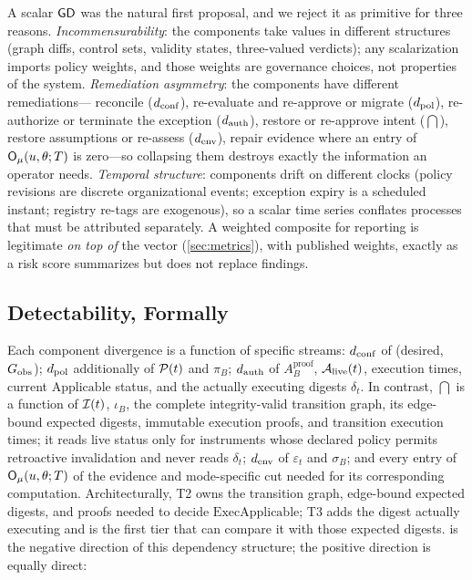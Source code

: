 A scalar $\mathsf{GD}$ was the natural first proposal, and we reject it as primitive
for three reasons. \emph{Incommensurability}: the components take values in
different structures (graph diffs, control sets, validity states,
three-valued verdicts); any scalarization imports policy weights, and those
weights are governance choices, not properties of the system.
\emph{Remediation asymmetry}: the components have different remediations---%
reconcile ($d_{\mathrm{conf}}$), re-evaluate and re-approve or migrate ($d_{\mathrm{pol}}$),
re-authorize or terminate the exception ($d_{\mathrm{auth}}$), restore or re-approve
intent ($\dint$), restore assumptions or re-assess ($d_{\mathrm{env}}$), repair evidence
where an entry of $\mathsf{O}_{\mu}(u,\theta;T)$ is zero---so collapsing them
destroys exactly the information an operator
needs. \emph{Temporal structure}: components drift on different clocks
(policy revisions are discrete organizational events; exception expiry is a
scheduled instant; registry re-tags are exogenous), so a scalar time series
conflates processes that must be attributed separately. A weighted composite
for reporting is legitimate \emph{on top of} the vector (\cref{sec:metrics}),
with published weights, exactly as a risk score summarizes but does not
replace findings.

\subsection{Detectability, Formally}
\label{sec:model-detect}

Each component divergence is a function of specific streams:
$d_{\mathrm{conf}}$ of (desired, $G_{\mathrm{obs}}$); $d_{\mathrm{pol}}$ additionally of $\mathcal{P}(t)$ and
$\pi_B$; $d_{\mathrm{auth}}$ of $A_B^{\mathrm{proof}}$, $\mathcal{A}_{\mathrm{live}}(t)$,
execution times, current $\mathrm{Applicable}$ status, and the actually
executing digests $\delta_t$. In contrast, $\dint$ is a function of $\mathcal{I}(t)$,
$\iota_B$, the complete integrity-valid transition graph, its edge-bound
expected digests, immutable execution proofs, and transition execution times;
it reads live status only for instruments whose declared policy permits
retroactive invalidation and never reads $\delta_t$;
$d_{\mathrm{env}}$ of $\varepsilon_t$ and $\sigma_B$; and every
entry of $\mathsf{O}_{\mu}(u,\theta;T)$ of the evidence and mode-specific cut
needed for its corresponding computation. Architecturally, T2 owns the
transition graph, edge-bound expected digests, and proofs needed to decide
$\mathrm{ExecApplicable}$; T3 adds the digest actually executing and is the
first tier that can compare it with those expected digests.
 is the negative direction of this
dependency structure; the positive direction is equally direct:

